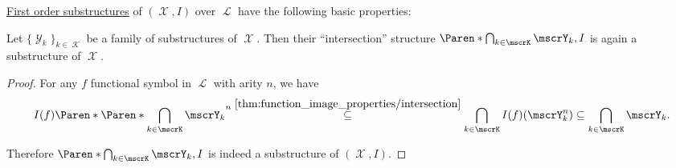 \begin{proposition}\label{thm:first_order_substructure_properties}
  \hyperref[def:first_order_substructure]{First order substructures} of \( (\mscrX, I) \) over \( \mscrL \) have the following basic properties:
  \begin{PropEnum}
     Let \( \{ \mscrY_k \}_{k \in \mscrK} \) be a family of substructures of \( \mscrX \). Then their \enquote{intersection} structure \( \Paren*{\bigcap_{k \in \mscrK} \mscrY_k, I} \) is again a substructure of \( \mscrX \).
  \end{PropEnum}
\end{proposition}
\begin{proof}
   For any \( f \) functional symbol in \( \mscrL \) with arity \( n \), we have
  \begin{equation*}
    I(f)\Paren*{\Paren*{\bigcap_{k \in \mscrK} \mscrY_k}^n}
    \overset {\ref{thm:function_image_properties/intersection}} \subseteq
    \bigcap_{k \in \mscrK} I(f)(\mscrY_k^n) \subseteq \bigcap_{k \in \mscrK} \mscrY_k.
  \end{equation*}

  Therefore \( \Paren*{\bigcap_{k \in \mscrK} \mscrY_k, I} \) is indeed a substructure of \( (\mscrX, I) \).
\end{proof}

